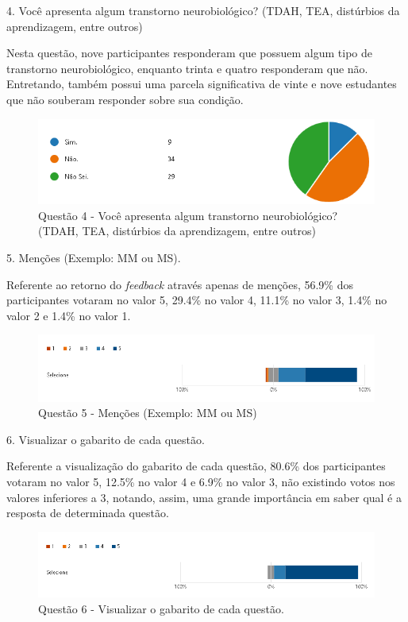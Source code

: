 4. Você apresenta algum transtorno neurobiológico? (TDAH, TEA, distúrbios da aprendizagem, entre outros)

Nesta questão, nove participantes responderam que possuem algum tipo de transtorno neurobiológico, enquanto trinta e quatro responderam que não. Entretando, também possui uma parcela significativa de vinte e nove estudantes que não souberam responder sobre sua condição.

\begin{figure}[H]
\centering
\caption{Questão 4 - Você apresenta algum transtorno neurobiológico? (TDAH, TEA, distúrbios da aprendizagem, entre outros)}
\includegraphics[scale=0.6]{figuras/4.png}
\end{figure}

5. Menções (Exemplo: MM ou MS).

Referente ao retorno do \textit{feedback} através apenas de menções, 56.9\% dos participantes votaram no valor 5, 29.4\% no valor 4, 11.1\% no valor 3, 1.4\% no valor 2 e 1.4\% no valor 1.

\begin{figure}[H]
\centering
\caption{Questão 5 - Menções (Exemplo: MM ou MS)}
\includegraphics[scale=0.6]{figuras/5.png}
\end{figure}

6. Visualizar o gabarito de cada questão.

Referente a visualização do gabarito de cada questão, 80.6\% dos participantes votaram no valor 5, 12.5\% no valor 4 e 6.9\% no valor 3, não existindo votos nos valores inferiores a 3, notando, assim, uma grande importância em saber qual é a resposta de determinada questão.

\begin{figure}[H]
\centering
\caption{Questão 6 - Visualizar o gabarito de cada questão.}
\includegraphics[scale=0.6]{figuras/6.png}
\end{figure}


